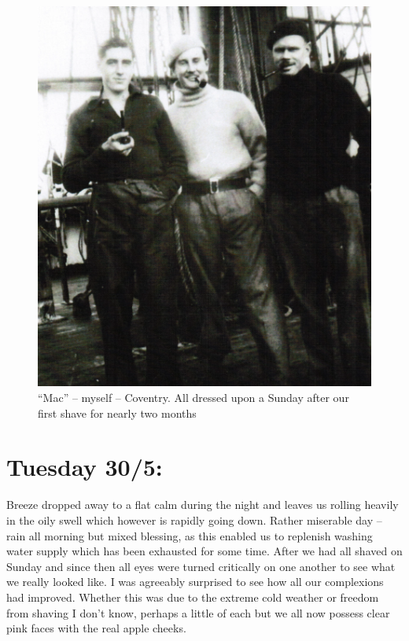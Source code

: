 \documentclass[
  11pt,
  msmallroyalvopaper
]{memoir}
\begin{document}
\begin{figure}
\centering
\includegraphics{./images/image016.png}
\caption{``Mac'' -- myself -- Coventry. All dressed upon a Sunday after
our first shave for nearly two months}
\end{figure}

\hypertarget{tuesday-305}{%
\section{Tuesday 30/5:}\label{tuesday-305}}

Breeze dropped away to a flat calm during the night and leaves us
rolling heavily in the oily swell which however is rapidly going down.
Rather miserable day -- rain all morning but mixed blessing, as this
enabled us to replenish washing water supply which has been exhausted
for some time. After we had all shaved on Sunday and since then all eyes
were turned critically on one another to see what we really looked like.
I was agreeably surprised to see how all our complexions had improved.
Whether this was due to the extreme cold weather or freedom from shaving
I don't know, perhaps a little of each but we all now possess clear pink
faces with the real apple cheeks.
\end{document}
